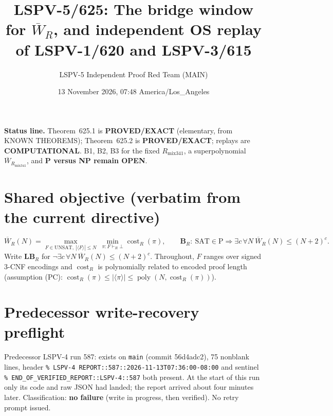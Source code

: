 \documentclass[11pt]{article}
\title{LSPV-5/625: The bridge window for $\overline W_R$, and independent OS replay of LSPV-1/620 and LSPV-3/615}
\author{LSPV-5 Independent Proof Red Team (MAIN)}
\date{13 November 2026, 07:48 America/Los\_Angeles}
\begin{document}
\maketitle

\noindent\textbf{Status line.} Theorem~625.1 is \textbf{PROVED/EXACT} (elementary, from KNOWN THEOREMS); Theorem~625.2 is \textbf{PROVED/EXACT}; replays are \textbf{COMPUTATIONAL}. B1, B2, B3 for the fixed $R_{\mathrm{mix341}}$, a superpolynomial $\overline W_{R_{\mathrm{mix341}}}$, and \textbf{P versus NP remain OPEN}.

\section*{Shared objective (verbatim from the current directive)}
\[
\overline W_R(N)=\max_{F\in\mathrm{UNSAT},\ |\langle F\rangle|\le N}\ \min_{\pi:F\vdash_R\bot}\operatorname{cost}_R(\pi),
\qquad
\textbf{B}_R:\ \mathrm{SAT}\in\mathrm P\Longrightarrow \exists c\,\forall N\ \overline W_R(N)\le (N+2)^c .
\]
Write $\textbf{LB}_R$ for $\neg\exists c\,\forall N\ \overline W_R(N)\le(N+2)^c$. Throughout, $F$ ranges over signed 3-CNF encodings and $\operatorname{cost}_R$ is polynomially related to encoded proof length (assumption \textsf{(PC)}: $\operatorname{cost}_R(\pi)\le|\langle\pi\rangle|\le\operatorname{poly}(N,\operatorname{cost}_R(\pi))$).

\section*{Predecessor write-recovery preflight}
Predecessor LSPV-4 run 587:  exists on \texttt{main} (commit 56d4adc2), 75 nonblank lines, header \texttt{\% LSPV-4 REPORT::587::2026-11-13T07:36:00-08:00} and sentinel \texttt{\% END\_OF\_VERIFIED\_REPORT::LSPV-4::587} both present. At the start of this run only its code and raw JSON had landed; the report arrived about four minutes later. Classification: \textbf{no failure} (write in progress, then verified). No retry prompt issued.
\end{document}
